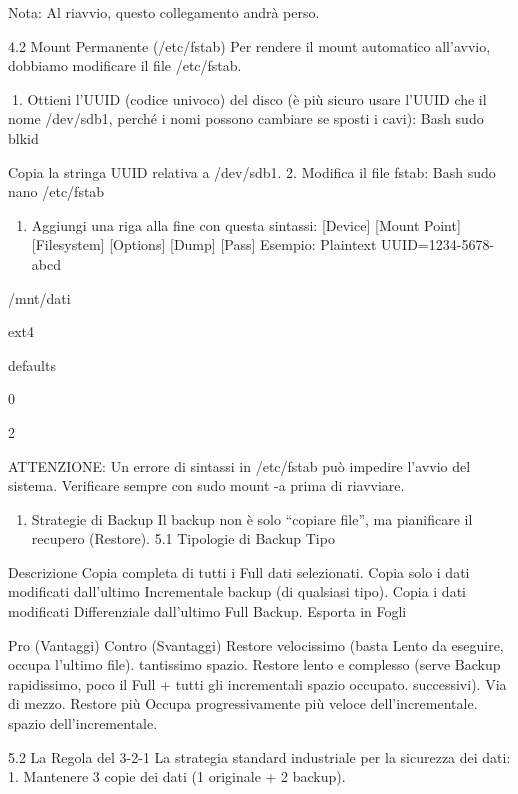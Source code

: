\documentclass[11pt,a4paper]{article}
\providecommand{\tightlist}{%
  \setlength{\itemsep}{0pt}\setlength{\parskip}{0pt}}
\begin{document}
Nota: Al riavvio, questo collegamento andrà perso.

4.2 Mount Permanente (/etc/fstab) Per rendere il mount automatico
all'avvio, dobbiamo modificare il file /etc/fstab.

1. Ottieni l'UUID (codice univoco) del disco (è più sicuro usare l'UUID
che il nome /dev/sdb1, perché i nomi possono cambiare se sposti i cavi):
Bash sudo blkid

Copia la stringa UUID relativa a /dev/sdb1. 2. Modifica il file fstab:
Bash sudo nano /etc/fstab

\begin{enumerate}
\def\labelenumi{\arabic{enumi}.}
\setcounter{enumi}{2}
\tightlist
\item
  Aggiungi una riga alla fine con questa sintassi: {[}Device{]} {[}Mount
  Point{]} {[}Filesystem{]} {[}Options{]} {[}Dump{]} {[}Pass{]} Esempio:
  Plaintext UUID=1234-5678-abcd
\end{enumerate}

/mnt/dati

ext4

defaults

0

2

ATTENZIONE: Un errore di sintassi in /etc/fstab può impedire l'avvio del
sistema. Verificare sempre con sudo mount -a prima di riavviare.

\begin{enumerate}
\def\labelenumi{\arabic{enumi}.}
\setcounter{enumi}{4}
\tightlist
\item
  Strategie di Backup Il backup non è solo ``copiare file'', ma
  pianificare il recupero (Restore). 5.1 Tipologie di Backup Tipo
\end{enumerate}

Descrizione Copia completa di tutti i Full dati selezionati. Copia solo
i dati modificati dall'ultimo Incrementale backup (di qualsiasi tipo).
Copia i dati modificati Differenziale dall'ultimo Full Backup. Esporta
in Fogli

Pro (Vantaggi) Contro (Svantaggi) Restore velocissimo (basta Lento da
eseguire, occupa l'ultimo file). tantissimo spazio. Restore lento e
complesso (serve Backup rapidissimo, poco il Full + tutti gli
incrementali spazio occupato. successivi). Via di mezzo. Restore più
Occupa progressivamente più veloce dell'incrementale. spazio
dell'incrementale.

5.2 La Regola del 3-2-1 La strategia standard industriale per la
sicurezza dei dati: 1. Mantenere 3 copie dei dati (1 originale + 2
backup).
\end{document}
